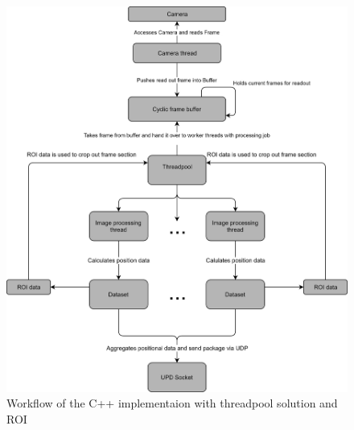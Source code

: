 \begin{figure}[H]
\includegraphics[width=\textwidth]{images/pi_workflow_500.jpg}
\caption{Workflow of the C++ implementaion with threadpool solution and ROI}
\label{c++ workflow map} 
\end{figure}
